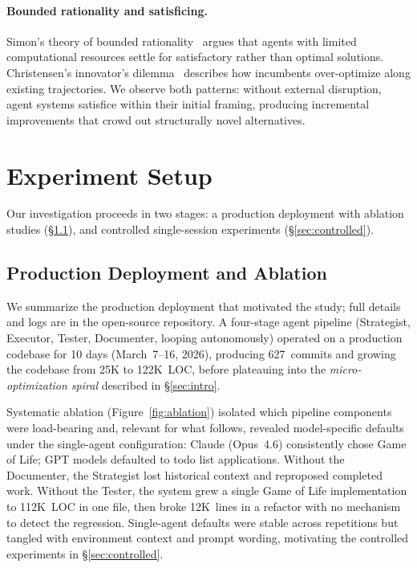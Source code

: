 \documentclass{article}
\begin{document}
\paragraph{Bounded rationality and satisficing.}
Simon's theory of bounded rationality~\citep{simon1956} argues that
agents with limited computational resources settle for satisfactory
rather than optimal solutions. Christensen's innovator's
dilemma~\citep{christensen1997} describes how incumbents
over-optimize along existing trajectories. We observe both
patterns: without external disruption, agent systems satisfice
within their initial framing, producing incremental improvements
that crowd out structurally novel alternatives.

\section{Experiment Setup}
\label{sec:setup}

Our investigation proceeds in two stages: a production deployment
with ablation studies (\S\ref{sec:trail}), and controlled
single-session experiments (\S\ref{sec:controlled}).

\subsection{Production Deployment and Ablation}
\label{sec:trail}

We summarize the production deployment that motivated the
study; full details and logs are in the open-source
repository. A four-stage agent pipeline (Strategist,
Executor, Tester, Documenter, looping autonomously)
operated on a production codebase for 10 days
(March~7--16, 2026), producing 627~commits and growing the
codebase from 25K to 122K~LOC, before plateauing into the
\emph{micro-optimization spiral} described in \S\ref{sec:intro}.

Systematic ablation (Figure~\ref{fig:ablation}) isolated
which pipeline components were load-bearing and, relevant for
what follows, revealed model-specific defaults under the
single-agent configuration: Claude (Opus~4.6) consistently
chose Game of Life; GPT models defaulted to todo list
applications. Without the Documenter, the Strategist lost
historical context and reproposed completed work. Without
the Tester, the system grew a single Game of Life
implementation to 112K~LOC in one file, then broke
12K~lines in a refactor with no mechanism to detect the
regression. Single-agent defaults were stable across
repetitions but tangled with environment context and prompt
wording, motivating the controlled experiments in
\S\ref{sec:controlled}.
\end{document}
